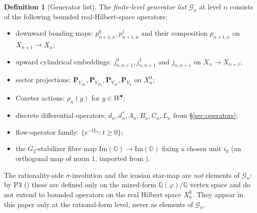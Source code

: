 \documentclass[11pt, a4paper]{amsart}
\theoremstyle{definition}
\newtheorem{definition}[theorem]{Definition}
\newcommand{\Q}{\mathbb{Q}}
\newcommand{\OO}{\mathbb{O}}
\renewcommand{\Im}{\mathrm{Im}}
\begin{document}
\begin{definition}[Generator list]
\label{def:generators}
The \emph{finite-level generator list} $\mathcal{G}_n$ at level
$n$ consists of the following bounded real-Hilbert-space operators:
\begin{itemize}
\item downward bonding maps: $p_{n+1, n}^0, p_{n+1, n}^1$ and
  their composition $p_{n+1, n}$ on $X_{n+1} \to X_n$;
\item upward cylindrical embeddings: $j_{n, n+1}^0, j_{n, n+1}^1$
  and $j_{n, n+1}$ on $X_n \to X_{n+1}$;
\item sector projections: $\mathbf{P}_{V_{H_4}},
  \mathbf{P}_{V_{D_4}}, \mathbf{P}_{V_{16}}, \mathbf{P}_{V_8}$ on
  $X_n^0$;
\item Coxeter actions: $\rho_n(g)$ for $g \in W^\bullet$;
\item discrete differential operators: $d_n, d_n^*, A_n, B_n, C_n,
  L_n$ from \S\ref{sec:operators};
\item flow-operator family: $\{e^{-t L_n} : t \geq 0\}$;
\item the $G_2$-stabilizer fibre map $\Im(\OO) \to \Im(\OO)$
  fixing a chosen unit $i_0$ (an orthogonal map of norm $1$,
  imported from \cite{AlgebraicSubstrate}).
\end{itemize}
The rationality-side $\sigma$-involution and the icosian star-map
are \emph{not} elements of $\mathcal{G}_n$: by P3
(\cite[Definition~\texttt{def:sigma}, Theorem~\texttt{thm:commute}]
{RefinementSpaces}) these are defined only on the mixed-form
$\Q(\varphi)/\Q$ vertex space and do not extend to bounded
operators on the real Hilbert space $X_n^0$. They appear in
this paper only at the rational-form level, never as elements
of $\mathcal{G}_n$.
\end{definition}
\end{document}
